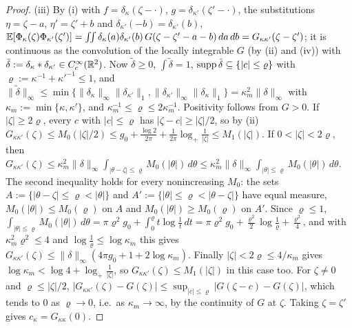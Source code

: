 \begin{proof}
(iii) By (i) with $f=\delta_\kappa(\zeta-\cdot)$, $g=\delta_{\kappa'}(\zeta'-\cdot)$, the
substitutions $\eta=\zeta-a$, $\eta'=\zeta'+b$ and $\delta_{\kappa'}(-b)=\delta_{\kappa'}(b)$,
$\mathbb{E}[\Phi_\kappa(\zeta)\Phi_{\kappa'}(\zeta')]=\iint\delta_\kappa(a)\delta_{\kappa'}(b)\,
G(\zeta-\zeta'-a-b)\,da\,db=G_{\kappa\kappa'}(\zeta-\zeta')$; it is continuous as the
convolution of the locally integrable $G$ (by (ii) and (iv)) with
$\tilde\delta:=\delta_\kappa*\delta_{\kappa'}\in C_c^\infty(\mathbb{R}^2)$. Now $\tilde\delta\ge0$,
$\int\tilde\delta=1$, $\operatorname{supp}\tilde\delta\subseteq\{|c|\le\varrho\}$ with
$\varrho:=\kappa^{-1}+\kappa'^{-1}\le1$, and
$\|\tilde\delta\|_\infty\le\min\{\|\delta_\kappa\|_\infty\|\delta_{\kappa'}\|_1,
\|\delta_{\kappa'}\|_\infty\|\delta_\kappa\|_1\}=\kappa_m^2\|\delta\|_\infty$ with
$\kappa_m:=\min\{\kappa,\kappa'\}$, and $\kappa_m^{-1}\le\varrho\le2\kappa_m^{-1}$.
Positivity follows from $G>0$. If $|\zeta|\ge2\varrho$, every $c$ with $|c|\le\varrho$ has
$|\zeta-c|\ge|\zeta|/2$, so by (ii)
$G_{\kappa\kappa'}(\zeta)\le M_0(|\zeta|/2)\le g_0+\frac{\log2}{2\pi}
+\frac1{2\pi}\log_+\frac1{|\zeta|}\le M_1(|\zeta|)$. If $0<|\zeta|<2\varrho$, then
$G_{\kappa\kappa'}(\zeta)\le\kappa_m^2\|\delta\|_\infty\int_{|\theta-\zeta|\le\varrho}
M_0(|\theta|)\,d\theta\le\kappa_m^2\|\delta\|_\infty\int_{|\theta|\le\varrho}M_0(|\theta|)\,d\theta$.
The second inequality holds for every nonincreasing $M_0$: the sets
$A:=\{|\theta-\zeta|\le\varrho<|\theta|\}$ and $A':=\{|\theta|\le\varrho<|\theta-\zeta|\}$ have
equal measure, $M_0(|\theta|)\le M_0(\varrho)$ on $A$ and $M_0(|\theta|)\ge M_0(\varrho)$ on
$A'$. Since $\varrho\le1$,
$\int_{|\theta|\le\varrho}M_0(|\theta|)\,d\theta=\pi\varrho^2g_0+\int_0^\varrho
t\log\frac1t\,dt=\pi\varrho^2g_0+\frac{\varrho^2}2\log\frac1\varrho+\frac{\varrho^2}4$, and with
$\kappa_m^2\varrho^2\le4$ and $\log\frac1\varrho\le\log\kappa_m$ this gives
$G_{\kappa\kappa'}(\zeta)\le\|\delta\|_\infty(4\pi g_0+1+2\log\kappa_m)$. Finally
$|\zeta|<2\varrho\le4/\kappa_m$ gives $\log\kappa_m<\log4+\log_+\frac1{|\zeta|}$, so
$G_{\kappa\kappa'}(\zeta)\le M_1(|\zeta|)$ in this case too. For $\zeta\ne0$ and
$\varrho\le|\zeta|/2$,
$|G_{\kappa\kappa'}(\zeta)-G(\zeta)|\le\sup_{|c|\le\varrho}|G(\zeta-c)-G(\zeta)|$, which tends
to $0$ as $\varrho\to0$, i.e.\ as $\kappa_m\to\infty$, by the continuity of $G$ at $\zeta$.
Taking $\zeta=\zeta'$ gives $c_\kappa=G_{\kappa\kappa}(0)$.
\end{proof}

